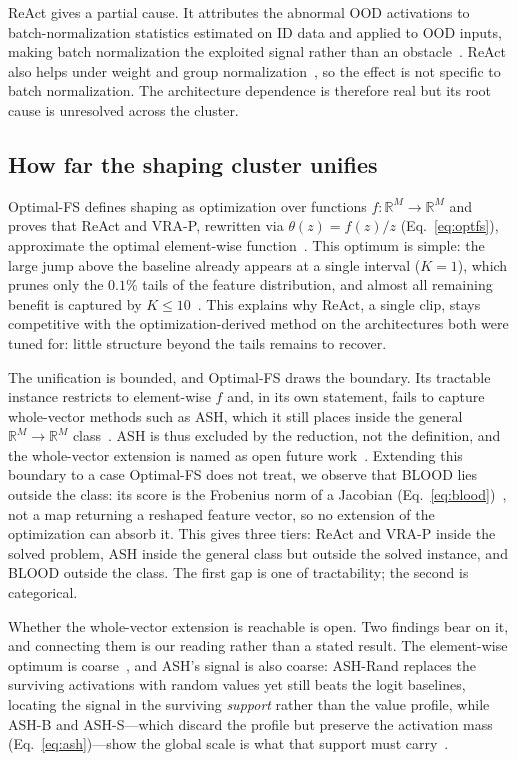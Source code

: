 \documentclass[a4paper]{article}
\begin{document}
ReAct gives a partial cause. It attributes the abnormal OOD activations to
batch-normalization statistics estimated on ID data and applied to OOD inputs, making
batch normalization the exploited signal rather than an obstacle~\citep{react}. ReAct
also helps under weight and group normalization~\citep{react}, so the effect is not
specific to batch normalization. The architecture dependence is therefore real but its
root cause is unresolved across the cluster.

\subsection{How far the shaping cluster unifies}
\label{subsec:disc-unify}

Optimal-FS defines shaping as optimization over functions
$f : \mathbb{R}^{M} \to \mathbb{R}^{M}$ and proves that ReAct and VRA-P, rewritten via
$\theta(z) = f(z)/z$ (Eq.~\ref{eq:optfs}), approximate the optimal element-wise
function~\citep{optimalfs}.
This optimum is simple: the large jump above the baseline already appears at a
single interval ($K=1$), which prunes only the $0.1\%$ tails of the feature
distribution, and almost all remaining benefit is captured by $K \leq
10$~\citep{optimalfs}. This explains why ReAct, a single clip, stays competitive
with the optimization-derived method on the architectures both were tuned for:
little structure beyond the tails remains to recover.

The unification is bounded, and Optimal-FS draws the boundary. Its tractable instance
restricts to element-wise $f$ and, in its own statement, fails to capture whole-vector
methods such as ASH, which it still places inside the general
$\mathbb{R}^{M} \to \mathbb{R}^{M}$ class~\citep{optimalfs}. ASH is thus excluded by the
reduction, not the definition, and the whole-vector extension is named as open future
work~\citep{optimalfs}. Extending this boundary to a case Optimal-FS does not treat, we
observe that BLOOD lies outside the class: its score is the Frobenius norm of a
Jacobian (Eq.~\ref{eq:blood})~\citep{blood}, not a map returning a reshaped feature
vector, so no extension of the optimization can absorb it. This gives three tiers: ReAct and VRA-P inside the solved
problem, ASH inside the general class but outside the solved instance, and BLOOD outside
the class. The first gap is one of tractability; the second is categorical.

Whether the whole-vector extension is reachable is open. Two findings bear on it, and
connecting them is our reading rather than a stated result. The element-wise optimum is coarse~\citep{optimalfs}, and ASH's signal is also
coarse: ASH-Rand replaces the surviving activations with random values yet still
beats the logit baselines, locating the signal in the surviving \emph{support}
rather than the value profile, while ASH-B and ASH-S---which discard the profile
but preserve the activation mass (Eq.~\ref{eq:ash})---show the global scale is what that support
must carry~\citep{ash}.
\end{document}
